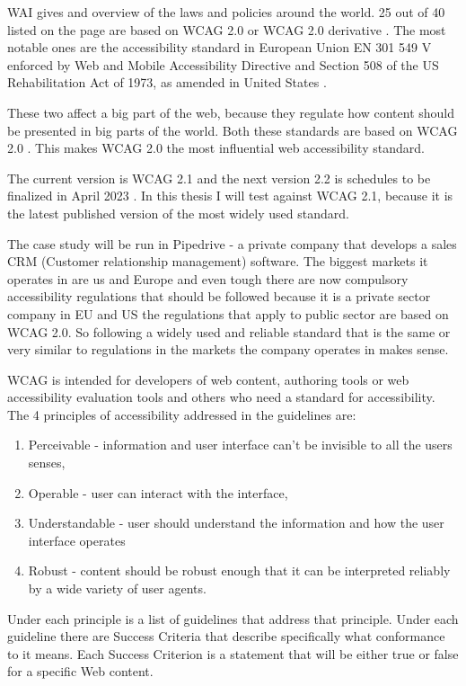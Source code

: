 \documentclass{master_thesis}
\begin{document}
WAI gives and overview of the laws and policies around the world. 25 out of 40 listed on the page are based on WCAG 2.0 or WCAG 2.0 derivative \citep{Mueller2018}. The most notable ones are the accessibility standard in European Union EN 301 549 V enforced by Web and Mobile Accessibility Directive \citep{MuellerEU2017} and Section 508 of the US Rehabilitation Act of 1973, as amended in United States \citep{MuellerUS2017}.

These two affect a big part of the web, because they regulate how content should be presented in big parts of the world. Both these standards are based on WCAG 2.0 \citep{MuellerEU2017,MuellerUS2017}. This makes WCAG 2.0 the most influential web accessibility standard.

The current version is WCAG 2.1 and the next version 2.2 is schedules to be finalized in April 2023 \citep{Henry2023}. In this thesis I will test against WCAG 2.1, because it is the latest published version of the most widely used standard.

The case study will be run in Pipedrive - a private company that develops a sales CRM (Customer relationship management) software. The biggest markets it operates in are us and Europe and even tough there are now compulsory accessibility regulations that should be followed because it is a private sector company in EU and US the regulations that apply to public sector are based on WCAG 2.0. So following a widely used and reliable standard that is the same or very similar to regulations in the markets  the company operates in makes sense.

WCAG is intended for developers of web content, authoring tools or web accessibility evaluation tools and others who need a standard for accessibility. The 4 principles of accessibility addressed in the guidelines are:
\begin{enumerate}
	\item Perceivable - information and user interface can't be invisible to all the users senses,
	\item Operable - user can interact with the interface,
	\item Understandable - user should understand the information and how the user interface operates
	\item Robust - content should be robust enough that it can be interpreted reliably by a wide variety of user agents.
\end{enumerate}
Under each principle is a list of guidelines that address that principle. Under each guideline there are Success Criteria that describe specifically what conformance to it means. Each Success Criterion is a statement that will be either true or false for a specific Web content. \citep{AGWGWP2022}
\end{document}
